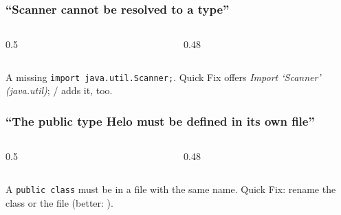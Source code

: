 \documentclass[aspectratio=169,10pt,compress]{beamer}
\begin{document}
\begin{frame}[t,fragile] \frametitle{``Scanner cannot be resolved to a type''}
  \begin{columns}[T]
    \begin{column}{0.5\textwidth}
    \end{column}
    \begin{column}{0.48\textwidth}
    \end{column}
  \end{columns}

  \vspace{0.2em}
  \small A missing \texttt{import java.util.Scanner;}. Quick Fix offers \emph{Import `Scanner' (java.util)};  /  adds it, too.
\end{frame}




\begin{frame}[t,fragile] \frametitle{``The public type Helo must be defined in its own file''}
  \begin{columns}[T]
    \begin{column}{0.5\textwidth}
    \end{column}
    \begin{column}{0.48\textwidth}
    \end{column}
  \end{columns}

  \vspace{0.2em}
  \small A \texttt{public class} must be in a file with the same name. Quick Fix: rename the class or the file
  (better: ).
\end{frame}
\end{document}
